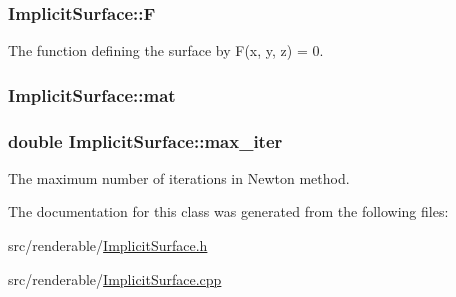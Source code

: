 \subsubsection[{\texorpdfstring{F}{F}}]{ Implicit\+Surface\+::F\hspace{0.3cm}{\ttfamily [private]}}\hypertarget{classImplicitSurface_aeeafee33bf827627323373167ce841eb}{}\label{classImplicitSurface_aeeafee33bf827627323373167ce841eb}


The function defining the surface by F(x, y, z) = 0. 

\subsubsection[{\texorpdfstring{mat}{mat}}]{ Implicit\+Surface\+::mat\hspace{0.3cm}{\ttfamily [private]}}\hypertarget{classImplicitSurface_adbb94dbb4d3271d5ed18752dde4aac32}{}\label{classImplicitSurface_adbb94dbb4d3271d5ed18752dde4aac32}
\subsubsection[{\texorpdfstring{max\+\_\+iter}{max_iter}}]{\setlength{\rightskip}{0pt plus 5cm}double Implicit\+Surface\+::max\+\_\+iter\hspace{0.3cm}{\ttfamily [private]}}\hypertarget{classImplicitSurface_ad92c06925b2496b7fe3a1d2659a87075}{}\label{classImplicitSurface_ad92c06925b2496b7fe3a1d2659a87075}


The maximum number of iterations in Newton method. 



The documentation for this class was generated from the following files\+:\begin{DoxyCompactItemize}
\item 
src/renderable/\hyperlink{ImplicitSurface_8h}{Implicit\+Surface.\+h}\item 
src/renderable/\hyperlink{ImplicitSurface_8cpp}{Implicit\+Surface.\+cpp}\end{DoxyCompactItemize}
